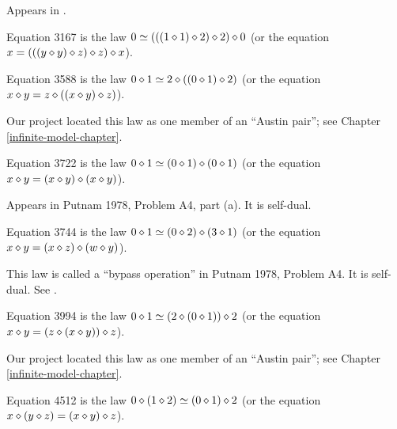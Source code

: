 Appears in \cite{mendelsohn-padmanabhan}.

\begin{definition}[Equation 3167]\label{eq3167}\leanok{}  Equation 3167 is the law $0 \simeq  (((1 \diamond 1) \diamond 2) \diamond 2) \diamond 0$ (or the equation $x = (((y \diamond y) \diamond z) \diamond z) \diamond x$).
\end{definition}


\begin{definition}[Equation 3588]
  \label{eq3588}\leanok{}
  Equation 3588 is the law $0 \diamond 1 \simeq 2 \diamond ((0 \diamond 1) \diamond 2)$ (or the equation $x \diamond y = z \diamond ((x \diamond y) \diamond z)$).
\end{definition}

Our project located this law as one member of an ``Austin pair''; see Chapter \ref{infinite-model-chapter}.

\begin{definition}[Equation 3722]\label{eq3722}\leanok{}  Equation 3722 is the law $0 \diamond 1  \simeq  (0 \diamond 1) \diamond (0 \diamond 1)$ (or the equation $x \diamond y = (x \diamond y) \diamond (x \diamond y)$).
\end{definition}

Appears in Putnam 1978, Problem A4, part (a).  It is self-dual.

\begin{definition}[Equation 3744]\label{eq3744}\leanok{}  Equation 3744 is the law $0 \diamond 1  \simeq  (0 \diamond 2) \diamond (3 \diamond 1)$ (or the equation $x \diamond y = (x \diamond z) \diamond (w \diamond y)$).
\end{definition}

This law is called a ``bypass operation'' in Putnam 1978, Problem A4. It is self-dual.  See .

\begin{definition}[Equation 3994]
  \label{eq3994}
  Equation 3994 is the law $0 \diamond 1 \simeq (2 \diamond (0 \diamond 1)) \diamond 2$ (or the equation $x \diamond y = (z \diamond (x \diamond y)) \diamond z$).
\end{definition}

Our project located this law as one member of an ``Austin pair''; see Chapter \ref{infinite-model-chapter}.

\begin{definition}[Equation 4512]\label{eq4512}\leanok{}  Equation 4512 is the law $0 \diamond (1 \diamond 2)  \simeq  (0 \diamond 1) \diamond 2$ (or the equation $x \diamond (y \diamond z) = (x \diamond y) \diamond z$).
\end{definition}

